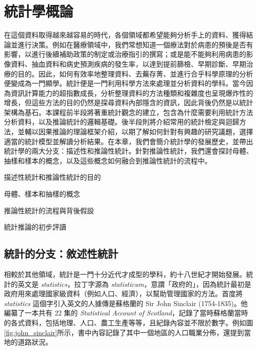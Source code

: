 \chapter{統計學概論}
    在這個資料取得越來越容易的時代，各個領域都希望能夠分析手上的資料、獲得結論並進行決策。例如在醫療領域中，我們常想知道一個療法對於病患的預後是否有影響，以進行後續補助政策的制定或治療指引的撰寫；或是能不能夠利用病患的影像資料、抽血資料和病史預測疾病的發生率，以達到提前篩檢、早期診斷、早期治療的目的。因此，如何有效率地整理資料、去蕪存菁、並進行合乎科學原理的分析便變成為一門顯學。統計便是一門利用科學方法來處理並分析資料的學科。當今因為資訊計算能力的超指數成長，分析整理資料的方法種類和複雜度也呈現爆炸性的增長，但這些方法的目的仍然是探尋資料內部隱含的資訊，因此背後仍然是以統計架構為基石。本課程前半段將著重統計觀念的建立，包含為什麼需要利用統計方法分析資料，以及推論統計的邏輯基礎。後半段則將介紹常用的統計檢定與迴歸方法，並輔以因果推論的理論框架介紹，以期了解如何針對有興趣的研究議題，選擇適當的統計模型並解讀分析結果。在本章，我們會簡介統計學的發展歷史，並帶出統計學的兩大分支：描述性和推論性統計。針對推論性統計，我們還會探討母體、抽樣和樣本的概念，以及這些概念如何融合到推論性統計的流程中。

\begin{introduction}[第 1 章學習目標]
    \item 描述性統計和推論性統計的目的
    \item 母體、樣本和抽樣的概念
    \item 推論性統計的流程與背後假設
    \item 統計推論的初步評讀
\end{introduction}

\section{統計的分支：敘述性統計}
    相較於其他領域，統計是一門十分近代才成型的學科，約十八世紀才開始發展。統計的英文是 \textit{statistics}，拉丁字源為 \textit{statisticum}，意謂「政府的」，因為統計最初是政府用來處理國家級資料（例如人口、經濟），以幫助管理國家的方法。首度將 \textit{statistics} 這個字引入英文的人據傳是蘇格蘭的 Sir John Sinclair (1754-1835)。他編纂了一本共有 22 集的 \textit{Statistical Account of Scotland}，記錄了當時蘇格蘭當時的各式資料，包括地理、人口、農工生產等等，且紀錄內容並不限於數字。例如圖\ref{fig:john_sinclair}所示，書中內容記錄了其中一個地區的人口職業分佈，還提到當地的道路狀況。


